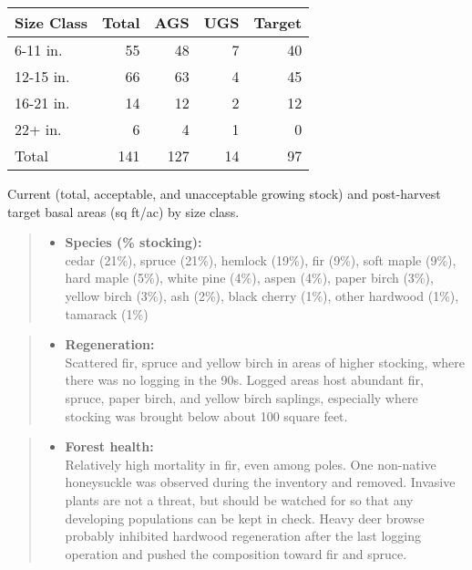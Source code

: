 \documentclass[]{tufte-handout}
\providecommand{\tightlist}{%
  \setlength{\itemsep}{0pt}\setlength{\parskip}{0pt}}
\begin{document}
\begin{tabular}{lrrrr}
\toprule
Size Class & Total & AGS & UGS & Target\\
\midrule
6-11 in. & 55 & 48 & 7 & 40\\
12-15 in. & 66 & 63 & 4 & 45\\
16-21 in. & 14 & 12 & 2 & 12\\
22+ in. & 6 & 4 & 1 & 0\\
Total & 141 & 127 & 14 & 97\\
\bottomrule
\end{tabular}

\vspace{2pt}
\footnotesize\parbox{200pt}{Current (total, acceptable, and unacceptable growing stock) and post-harvest target basal areas (sq ft/ac) by size class.}\normalsize

\begin{quote}
\begin{itemize}
\tightlist
\item
  \textbf{Species (\% stocking):}\\
  \vspace{2pt} cedar (21\%), spruce (21\%), hemlock (19\%), fir (9\%),
  soft maple (9\%), hard maple (5\%), white pine (4\%), aspen (4\%),
  paper birch (3\%), yellow birch (3\%), ash (2\%), black cherry (1\%),
  other hardwood (1\%), tamarack (1\%)
\end{itemize}
\end{quote}

\begin{quote}
\begin{itemize}
\tightlist
\item
  \textbf{Regeneration:}\\
  \vspace{2pt} Scattered fir, spruce and yellow birch in areas of higher
  stocking, where there was no logging in the 90s. Logged areas host
  abundant fir, spruce, paper birch, and yellow birch saplings,
  especially where stocking was brought below about 100 square feet.
\end{itemize}
\end{quote}

\begin{quote}
\begin{itemize}
\tightlist
\item
  \textbf{Forest health:}\\
  \vspace{2pt} Relatively high mortality in fir, even among poles. One
  non-native honeysuckle was observed during the inventory and removed.
  Invasive plants are not a threat, but should be watched for so that
  any developing populations can be kept in check. Heavy deer browse
  probably inhibited hardwood regeneration after the last logging
  operation and pushed the composition toward fir and spruce.
\end{itemize}
\end{quote}
\end{document}
